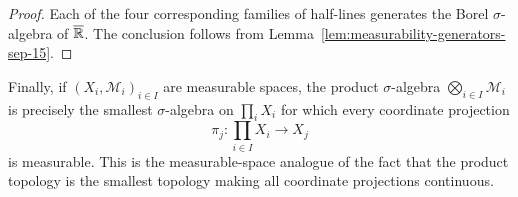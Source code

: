 \begin{proof}
  Each of the four corresponding families of half-lines generates the
  Borel $\sigma$-algebra of $\overline{\mathbb{R}}$. The conclusion follows
  from Lemma~\ref{lem:measurability-generators-sep-15}.
\end{proof}

Finally, if $(X_i,\mathcal M_i)_{i\in I}$ are measurable spaces, the
product $\sigma$-algebra $\bigotimes_{i\in I}\mathcal M_i$ is precisely
the smallest $\sigma$-algebra on $\prod_iX_i$ for which every coordinate
projection
\[
  \pi_j\colon\prod_{i\in I}X_i\longrightarrow X_j
\]
is measurable. This is the measurable-space analogue of the fact that
the product topology is the smallest topology making all coordinate
projections continuous.
